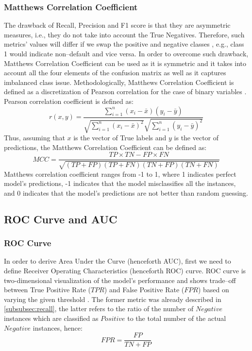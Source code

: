 \subsubsection{Matthews Correlation Coefficient}
The drawback of Recall, Precision and F1 score is that they are asymmetric measures, i.e., they do not take into account the True Negatives.
Therefore, such metrics' values will differ if we swap the positive and negative classes \citep{chicco2020advantages}, e.g., class 1 would indicate non--default and vice versa.
In order to overcome such drawback, Matthews Correlation Coefficient can be used as it is symmetric and it takes into account all the four elements of the confusion matrix as well as it captures imbalanced class issue.
Methodologically, Matthews Correlation Coefficient is defined as a discretization of Pearson correlation for the case of binary variables \citep{boughorbel2017optimal}.
Pearson correlation coefficient is defined as:
\begin{equation}\label{eq}
    r(x,y) = \frac{\sum\limits_{i=1}^n (x_i - \bar{x})(y_i - \bar{y})}{\sqrt{\sum\limits_{i=1}^n (x_i - \bar{x})^2} \sqrt{\sum\limits_{i=1}^n (y_i - \bar{y})^2}}
\end{equation}
Thus, assuming that $x$ is the vector of True labels and $y$ is the vector of predictions, the Matthews Correlation Coefficient can be defined as:
\begin{equation}\label{eq}
    MCC = \frac{TP \times TN - FP \times FN}{\sqrt{(TP + FP) (TP + FN) (TN + FP) (TN + FN)}}
\end{equation}
Matthews correlation coefficient ranges from -1 to 1, where 1 indicates perfect model's predictions, -1 indicates that the model misclassifies all the instances, and 0 indicates that the model's predictions are not better than random guessing.

\newpage
\subsection{ROC Curve and AUC}
\subsubsection{ROC Curve}
In order to derive Area Under the Curve (henceforth AUC), first we need to define Receiver Operating Characteristics (henceforth ROC) curve.
ROC curve is two-dimensional visualization of the model's performance and shows trade--off between True Positive Rate ($TPR$) and False Positive Rate ($FPR$) based on varying the given threshold \citep{han2011data}. The former metric was already described in \autoref{subsubsec:recall}, the latter refers to the ratio of the number of $Negative$ instances which are classified as $Positive$ to the total number of the actual $Negative$ instances, hence:
\begin{equation}\label{eq}
    FPR = \frac{FP}{TN + FP}
\end{equation}

